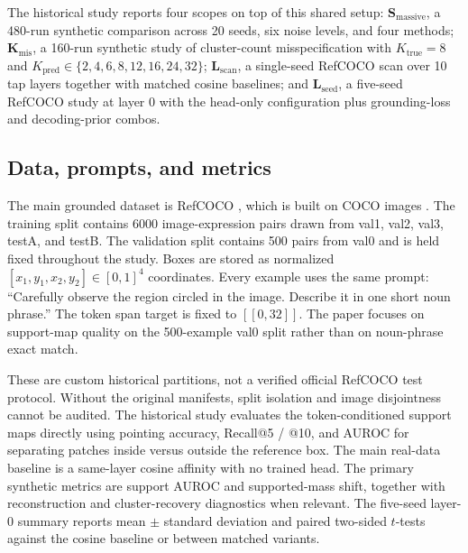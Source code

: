 \documentclass[11pt,a4paper]{article}
\begin{document}
The historical study reports four scopes on top of this shared setup: \textbf{S$_{\mathrm{massive}}$}, a 480-run synthetic comparison across 20 seeds, six noise levels, and four methods; \textbf{K$_{\mathrm{mis}}$}, a 160-run synthetic study of cluster-count misspecification with $K_{\mathrm{true}}=8$ and $K_{\mathrm{pred}}\in\{2,4,6,8,12,16,24,32\}$; \textbf{L$_{\mathrm{scan}}$}, a single-seed RefCOCO scan over 10 tap layers together with matched cosine baselines; and \textbf{L$_{\mathrm{seed}}$}, a five-seed RefCOCO study at layer $0$ with the head-only configuration plus grounding-loss and decoding-prior combos.

\subsection{Data, prompts, and metrics}

The main grounded dataset is RefCOCO \cite{yu2016refcoco}, which is built on COCO images \cite{lin2014coco}. The training split contains 6000 image-expression pairs drawn from val1, val2, val3, testA, and testB. The validation split contains 500 pairs from val0 and is held fixed throughout the study. Boxes are stored as normalized $[x_1,y_1,x_2,y_2] \in [0,1]^4$ coordinates. Every example uses the same prompt: ``Carefully observe the region circled in the image. Describe it in one short noun phrase.'' The token span target is fixed to $[[0,32]]$. The paper focuses on support-map quality on the 500-example val0 split rather than on noun-phrase exact match.

These are custom historical partitions, not a verified official RefCOCO test protocol. Without the original manifests, split isolation and image disjointness cannot be audited. The historical study evaluates the token-conditioned support maps directly using pointing accuracy, Recall@5 / @10, and AUROC for separating patches inside versus outside the reference box. The main real-data baseline is a same-layer cosine affinity with no trained head. The primary synthetic metrics are support AUROC and supported-mass shift, together with reconstruction and cluster-recovery diagnostics when relevant. The five-seed layer-$0$ summary reports mean $\pm$ standard deviation and paired two-sided $t$-tests against the cosine baseline or between matched variants.
\end{document}
